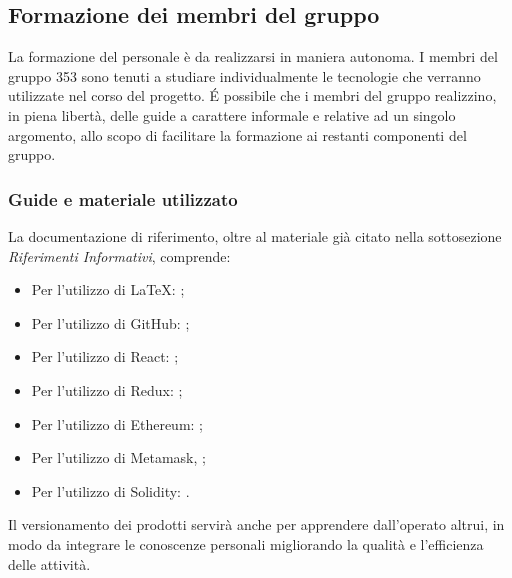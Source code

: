 \documentclass[NormeDiProgetto.tex]{subfiles}
\begin{document}
	\subsection{Formazione dei membri del gruppo}
		La formazione del personale è da realizzarsi in maniera autonoma. I membri del gruppo 353 sono tenuti a studiare individualmente le tecnologie che verranno utilizzate nel corso del progetto. \'{E} possibile che i membri del gruppo realizzino, in piena libertà, delle guide a carattere informale e relative ad un singolo argomento, allo scopo di facilitare la formazione ai restanti componenti del gruppo.

	\subsubsection{Guide e materiale utilizzato}
	 La documentazione di riferimento, oltre al materiale già citato nella sottosezione \emph{Riferimenti Informativi}, comprende:\\
	\begin{itemize}
		\item Per l'utilizzo di \LaTeX: ;\\
		\item Per l'utilizzo di GitHub: ;\\
		\item Per l'utilizzo di React: ;\\
		\item Per l'utilizzo di Redux: ;\\
		\item Per l'utilizzo di Ethereum: ;\\
		\item Per l'utilizzo di Metamask, ;\\ 
		\item Per l'utilizzo di Solidity: .\\
	\end{itemize}
	Il versionamento dei prodotti servirà anche per apprendere dall'operato
	altrui, in modo da integrare le conoscenze personali migliorando la qualità e
	l'efficienza delle attività.
	
\end{document}
